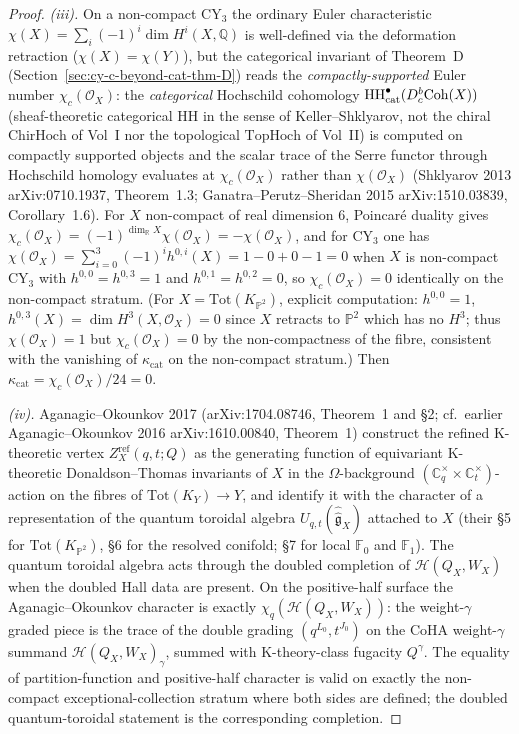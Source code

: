 \begin{proof}
\emph{(iii).} On a non-compact CY$_3$ the ordinary Euler
characteristic $\chi(X) = \sum_i (-1)^i \dim H^i(X, \mathbb Q)$
is well-defined via the deformation retraction ($\chi(X) =
\chi(Y)$), but the categorical invariant of Theorem~D
(Section~\ref{sec:cy-c-beyond-cat-thm-D}) reads the
\emph{compactly-supported} Euler number
$\chi_c(\mathcal O_X)$: the \emph{categorical} Hochschild cohomology
$\mathrm{HH}^\bullet_{\mathrm{cat}}(D^b_c\mathrm{Coh}(X))$ (sheaf-theoretic
categorical $\mathrm{HH}$ in the sense of Keller--Shklyarov, not the
chiral $\mathrm{ChirHoch}$ of Vol~I nor the topological
$\mathrm{TopHoch}$ of Vol~II) is computed on compactly
supported objects and the scalar trace of the Serre functor
through Hochschild homology evaluates at $\chi_c(\mathcal O_X)$
rather than $\chi(\mathcal O_X)$ (Shklyarov 2013
arXiv:0710.1937, Theorem~1.3; Ganatra--Perutz--Sheridan 2015
arXiv:1510.03839, Corollary~1.6). For $X$ non-compact of
real dimension $6$, Poincar\'e duality gives
$\chi_c(\mathcal O_X) = (-1)^{\dim_{\mathbb R} X} \chi(\mathcal O_X) = -\chi(\mathcal O_X)$,
and for CY$_3$ one has $\chi(\mathcal O_X) = \sum_{i=0}^3 (-1)^i h^{0,i}(X) =
1 - 0 + 0 - 1 = 0$ when $X$ is non-compact CY$_3$ with
$h^{0,0} = h^{0,3} = 1$ and $h^{0,1} = h^{0,2} = 0$, so
$\chi_c(\mathcal O_X) = 0$ identically on the non-compact
stratum. (For $X = \mathrm{Tot}(K_{\mathbb P^2})$, explicit
computation: $h^{0,0} = 1$, $h^{0,3}(X) = \dim H^3(X, \mathcal O_X) =
0$ since $X$ retracts to $\mathbb P^2$ which has no $H^3$; thus
$\chi(\mathcal O_X) = 1$ but $\chi_c(\mathcal O_X) = 0$ by the
non-compactness of the fibre, consistent with the vanishing of
$\kappa_{\mathrm{cat}}$ on the non-compact stratum.) Then
$\kappa_{\mathrm{cat}} = \chi_c(\mathcal O_X)/24 = 0$.

\emph{(iv).} Aganagic--Okounkov 2017 (arXiv:1704.08746,
Theorem~1 and \S 2; cf.\ earlier
Aganagic--Okounkov 2016 arXiv:1610.00840, Theorem~1) construct
the refined K-theoretic vertex $Z^{\mathrm{ref}}_X(q, t; Q)$ as
the generating function of equivariant K-theoretic
Donaldson--Thomas invariants of $X$ in the $\Omega$-background
$(\mathbb C^\times_q \times \mathbb C^\times_t)$-action on the
fibres of $\mathrm{Tot}(K_Y) \to Y$, and identify it with the
character of a representation of the quantum toroidal algebra
$U_{q, t}(\widehat{\widehat{\mathfrak g}}_X)$ attached to $X$
(their \S 5 for $\mathrm{Tot}(K_{\mathbb P^2})$, \S 6 for the
resolved conifold; \S 7 for local $\mathbb F_0$ and $\mathbb F_1$).
The quantum toroidal algebra acts through the doubled completion of
\(\mathcal H(Q_X,W_X)\) when the doubled Hall data are present. On the
positive-half surface the
Aganagic--Okounkov character is exactly
\(\chi_q(\mathcal H(Q_X,W_X))\): the weight-$\gamma$
graded piece is the trace of the double grading
$(q^{L_0}, t^{J_0})$ on the CoHA weight-$\gamma$ summand
$\mathcal H(Q_X, W_X)_\gamma$, summed with K-theory-class
fugacity $Q^\gamma$. The equality of partition-function and
positive-half character is valid on exactly the non-compact
exceptional-collection stratum where both sides are defined; the
doubled quantum-toroidal statement is the corresponding completion.
\end{proof}

